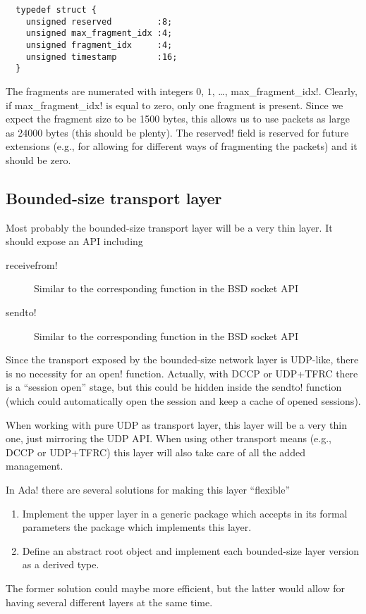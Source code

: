 \documentclass{medusabook}
\begin{document}
\begin{verbatim}
  typedef struct {
    unsigned reserved         :8;
    unsigned max_fragment_idx :4;  
    unsigned fragment_idx     :4;
    unsigned timestamp        :16;
  }
\end{verbatim}
%
The fragments are numerated with integers $0$, $1$, \ldots, \ttt
max_fragment_idx!.  Clearly, if \ttt max_fragment_idx! is equal to
zero, only one fragment is present.  Since we expect the fragment size
to be 1500 bytes, this allows us to use packets as large as 24000
bytes (this should be plenty).  The \ttt reserved! field is reserved
for future extensions (e.g., for allowing for different ways of
fragmenting the packets) and it should be zero.

\subsection{Bounded-size transport layer}
\label{sub:2.1.0;dsp_book}

Most probably the bounded-size transport layer will be a very thin
layer.  It should expose an API including

\begin{description}
  \item[{\ttt receivefrom!}] Similar to the corresponding function in
  the BSD socket API
  \item[{\ttt sendto!}] Similar to the corresponding function in
  the BSD socket API
\end{description}
%
Since the transport exposed by the bounded-size network layer is
UDP-like, there is no necessity for an \ttt open! function.  Actually,
with DCCP or UDP+TFRC there is a ``session open'' stage, but this
could be hidden inside the \ttt sendto! function (which could
automatically open the session and keep a cache of opened sessions).

When working with pure UDP as transport layer, this layer will be a
very thin one, just mirroring the UDP API.  When using other transport
means (e.g., DCCP or UDP+TFRC) this layer will also take care of all
the added management.  

In \ttt Ada! there are several solutions for making this layer
``flexible'' 

\begin{enumerate}
  \item
    Implement the upper layer in a generic package which accepts in
    its formal parameters the package which implements this layer.
  \item 
    Define an abstract root object and implement each bounded-size
    layer version as a derived type.
\end{enumerate}
%
The former solution could maybe more efficient, but the latter would
allow for having several different layers at the same time.
\end{document}
